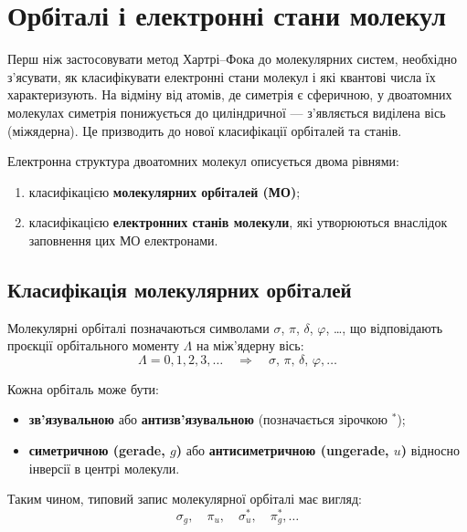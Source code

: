 \section{Орбіталі і електронні стани молекул}
Перш ніж застосовувати метод Хартрі--Фока до молекулярних систем,
необхідно з'ясувати, як класифікувати електронні стани молекул
і які квантові числа їх характеризують.
На відміну від атомів, де симетрія є сферичною,
у двоатомних молекулах симетрія понижується до циліндричної ---
з'являється виділена вісь (міжядерна).
Це призводить до нової класифікації орбіталей та станів.

Електронна структура двоатомних молекул описується двома рівнями:
\begin{enumerate}
    \item класифікацією \textbf{молекулярних орбіталей (МО)};
    \item класифікацією \textbf{електронних станів молекули}, які утворюються внаслідок заповнення цих МО електронами.
\end{enumerate}

\subsection{Класифікація молекулярних орбіталей}

Молекулярні орбіталі позначаються символами
$\sigma$, $\pi$, $\delta$, $\varphi$, \ldots,
що відповідають проєкції орбітального моменту $\Lambda$ на між'ядерну вісь:
\[
\Lambda = 0,1,2,3,\ldots \quad \Rightarrow \quad
\sigma,\, \pi,\, \delta,\, \varphi, \ldots
\]

Кожна орбіталь може бути:
\begin{itemize}
    \item \textbf{зв’язувальною} або \textbf{антизв’язувальною} (позначається зірочкою ${}^*$);
    \item \textbf{симетричною (gerade, $g$)} або \textbf{антисиметричною (ungerade, $u$)} відносно інверсії в центрі молекули.
\end{itemize}

Таким чином, типовий запис молекулярної орбіталі має вигляд:
\[
\sigma_g, \quad \pi_u, \quad \sigma_u^*, \quad \pi_g^*, \ldots
\]

